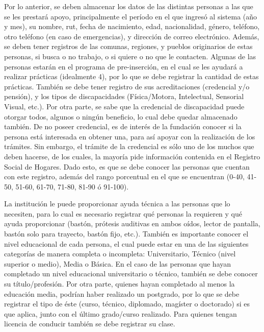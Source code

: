 \documentclass[letterpaper]{article}
\begin{document}
Por lo anterior, se deben almacenar los datos de las distintas personas a las que se les prestará apoyo, principalmente el período en el que ingresó al sistema (año y mes), su nombre, rut, fecha de nacimiento, edad, nacionalidad, género, teléfono, otro teléfono (en caso de emergencias), y dirección de correo electrónico. Además, se deben tener registros de las comunas, regiones, y pueblos originarios de estas personas, si busca o no trabajo, o si quiere o no que le contacten. Algunas de las personas estarán en el programa de pre-inserción, en el cual se les ayudará a realizar prácticas (idealmente 4), por lo que se debe registrar la cantidad de estas prácticas. También se debe tener registro de sus acreditaciones (credencial y/o pensión), y los tipos de discapacidades (Física/Motora, Intelectual, Sensorial Visual, etc.). Por otra parte, se sabe que la credencial de discapacidad puede otorgar todos, algunos o ningún beneficio, lo cual debe quedar almacenado también. De no poseer credencial, es de interés de la fundación conocer si la persona está interesada en obtener una, para así apoyar con la realización de los trámites. Sin embargo, el trámite de la credencial es sólo uno de los muchos que deben hacerse, de los cuales, la mayoría pide información contenida en el Registro Social de Hogares. Dado esto, es que se debe conocer las personas que cuentan con este registro, además del rango porcentual en el que se encuentran (0-40, 41-50, 51-60, 61-70, 71-80, 81-90 ó 91-100).

La institución le puede proporcionar ayuda técnica a las personas que lo necesiten, para lo cual es necesario registrar qué personas la requieren y qué ayuda proporcionar (bastón, prótesis auditivas en ambos oídos, lector de pantalla, bastón solo para trayecto, bastón fijo, etc.). También es importante conocer el nivel educacional de cada persona, el cual puede estar en una de las siguientes categorías de manera completa o incompleta: Universitario, Técnico (nivel superior o medio), Media o Básica. En el caso de las personas que hayan completado un nivel educacional universitario o técnico, también se debe conocer su título/profesión. Por otra parte, quienes hayan completado al menos la educación media, podrían haber realizado un postgrado, por lo que se debe registrar el tipo de éste (curso, técnico, diplomado, magíster o doctorado) si es que aplica, junto con el último grado/curso realizado. Para quienes tengan licencia de conducir también se debe registrar su clase.
\end{document}
